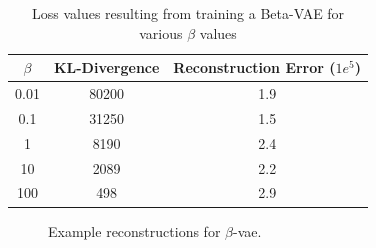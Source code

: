 \begin{table}[!ht]
    \centering
    \caption{Loss values resulting from training a Beta-VAE for various $\beta$ values}
    \label{tab:beta-vae-loss-values}
    \begin{tabular}{ccc}
        \hline
        $\beta$ & KL-Divergence & Reconstruction Error ($1e^5$) \\
        \hline
        0.01    & 80200         & 1.9                           \\
        0.1     & 31250         & 1.5                           \\
        1       & 8190          & 2.4                           \\
        10      & 2089          & 2.2                           \\
        100     & 498           & 2.9                           \\
        \hline
    \end{tabular}
\end{table}

\begin{figure}[!ht]
    \centering
    \caption{Example reconstructions for $\beta$-vae.}
    \label{fig:beta-vae-recon-examples}
     \quad
\end{figure}
